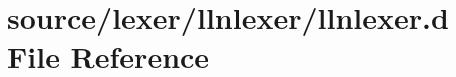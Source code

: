 \hypertarget{llnlexer_8d}{
\section{source/lexer/llnlexer/llnlexer.d File Reference}
\label{llnlexer_8d}
}
